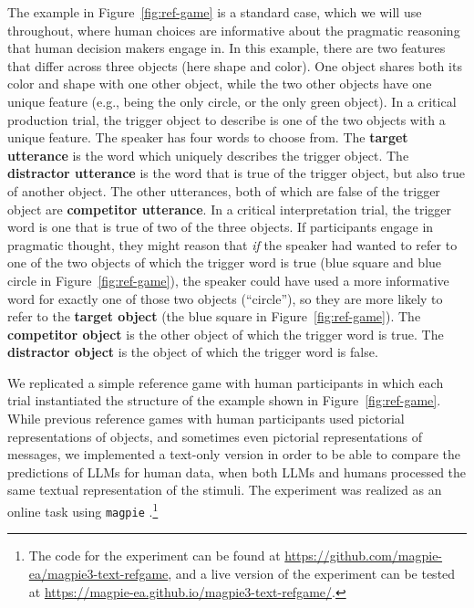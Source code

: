 \documentclass[fleqn]{article}
\begin{document}
The example in Figure~\ref{fig:ref-game} is a standard case, which we will use throughout, where human choices are informative about the pragmatic reasoning that human decision makers engage in.
In this example, there are two features that differ across three objects (here shape and color).
One object shares both its color and shape with one other object, while the two other objects have one unique feature (e.g., being the only circle, or the only green object).
%
In a critical production trial, the trigger object to describe is one of the two objects with a unique feature.
The speaker has four words to choose from.
The \textbf{target utterance} is the word which uniquely describes the trigger object.
The \textbf{distractor utterance} is the word that is true of the trigger object, but also true of another object.
The other utterances, both of which are false of the trigger object are \textbf{competitor utterance}.
%
In a critical interpretation trial, the trigger word is one that is true of two of the three objects.
If participants engage in pragmatic thought, they might reason that \emph{if} the speaker had wanted to refer to one of the two objects of which the trigger word is true (blue square and blue circle in Figure~\ref{fig:ref-game}), the speaker could have used a more informative word for exactly one of those two objects (``circle''), so they are more likely to refer to the \textbf{target object} (the blue square in Figure~\ref{fig:ref-game}).
The \textbf{competitor object} is the other object of which the trigger word is true.
The \textbf{distractor object} is the object of which the trigger word is false.

We replicated a simple reference game with human participants in which each trial instantiated the structure of the example shown in Figure~\ref{fig:ref-game}.
While previous reference games with human participants used pictorial representations of objects, and sometimes even pictorial representations of messages, we implemented a text-only version in order to be able to compare the predictions of LLMs for human data, when both LLMs and humans processed the same textual representation of the stimuli.
The experiment was realized as an online task using \texttt{magpie} \citep{FrankeJi:magpie:-Minimal}.\footnote{
  The code for the experiment can be found at \href{https://github.com/magpie-ea/magpie3-text-refgame}{https://github.com/magpie-ea/magpie3-text-refgame}, and a live version of the experiment can be tested at \href{https://magpie-ea.github.io/magpie3-text-refgame/}{https://magpie-ea.github.io/magpie3-text-refgame/}.
}
\end{document}
